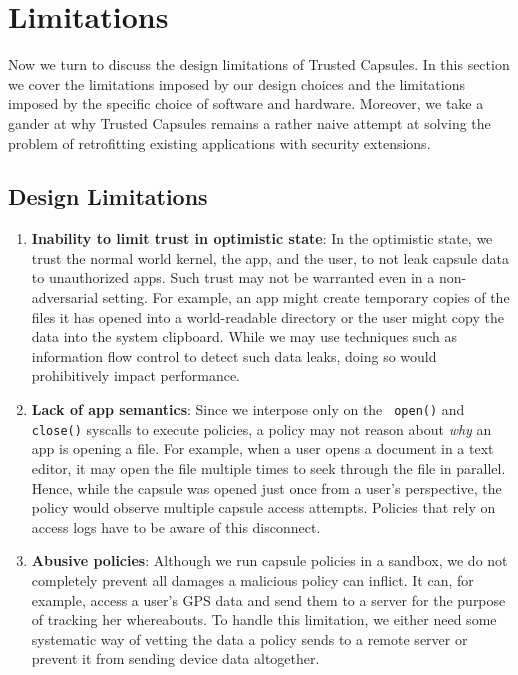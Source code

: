 \chapter{Limitations}
\label{sec:limitations}

Now we turn to discuss the design limitations of Trusted Capsules. In this
section we cover the limitations imposed by our design choices and the
limitations imposed by the specific choice of software and hardware. Moreover,
we take a gander at why Trusted Capsules remains a rather naive attempt at
solving the problem of retrofitting existing applications with security
extensions.

\section{Design Limitations}
\begin{enumerate}
    \item {\bf Inability to limit trust in optimistic state}: In the optimistic
state, we trust the normal world kernel, the app, and the user, to not leak
capsule data to unauthorized apps. Such trust may not be warranted even in a
non-adversarial setting. For example, an app might create temporary copies of
the files it has opened into a world-readable directory or the user might copy
the data into the system clipboard. While we may use techniques such as
information flow control to detect such data leaks, doing so would prohibitively
impact performance.

    \item {\bf Lack of app semantics}: Since we interpose only on the {\tt
    open()} and {\tt close()} syscalls to execute policies, a policy may not
    reason about {\em why} an app is opening a file. For example, when a user
    opens a document in a text editor, it may open the file multiple times to
    seek through the file in parallel. Hence, while the capsule was opened just
    once from a user's perspective, the policy would observe multiple capsule
    access attempts. Policies that rely on access logs have to be aware of this
    disconnect.

    \item {\bf Abusive policies}: Although we run capsule policies in a sandbox,
we do not completely prevent all damages a malicious policy can inflict. It can,
for example, access a user's GPS data and send them to a server for the purpose
of tracking her whereabouts. To handle this limitation, we either need some
systematic way of vetting the data a policy sends to a remote server or prevent
it from sending device data altogether.


\end{enumerate}
